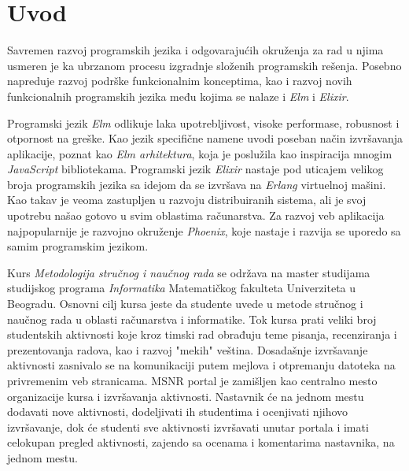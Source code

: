 \documentclass[12pt,oneside]{memoir}
\begin{document}
\frontmatter
\naslovna
\komisija
\apstrakt
\tableofcontents*

\mainmatter

\chapter{Uvod}
Savremen razvoj programskih jezika i odgovarajućih okruženja za rad u njima
usmeren je ka ubrzanom procesu izgradnje složenih programskih rešenja. Posebno
napreduje razvoj podrške funkcionalnim konceptima, kao i razvoj novih funkcionalnih
programskih jezika među kojima se nalaze i \emph{Elm} i \emph{Elixir}. 

Programski jezik \emph{Elm} odlikuje laka upotrebljivost, visoke performase,
robusnost i otpornost na greške. Kao jezik specifične namene uvodi poseban
način izvršavanja aplikacije, poznat kao \emph{Elm arhitektura}, koja je
poslužila kao inspiracija mnogim \emph{JavaScript} bibliotekama.
Programski jezik \emph{Elixir} nastaje pod
uticajem velikog broja programskih jezika sa idejom da se izvršava na \emph{Erlang}
virtuelnoj mašini. Kao takav je veoma zastupljen u razvoju distribuiranih sistema,
ali je svoj upotrebu našao gotovo u svim oblastima računarstva.
Za razvoj veb aplikacija najpopularnije je razvojno okruženje \emph{Phoenix}, koje
nastaje i razvija se uporedo sa samim programskim jezikom.

Kurs \emph{Metodologija stručnog i naučnog rada} se održava na master studijama
studijskog programa \emph{Informatika} Matematičkog fakulteta Univerziteta u Beogradu.
Osnovni cilj kursa jeste da studente uvede u metode stručnog i naučnog rada u oblasti računarstva
i informatike. Tok kursa prati veliki broj studentskih aktivnosti koje kroz timski rad
obrađuju teme pisanja, recenziranja i prezentovanja radova, kao i razvoj "mekih" veština.
Dosadašnje izvršavanje aktivnosti zasnivalo se na komunikaciji putem mejlova i otpremanju datoteka na
privremenim veb stranicama. MSNR portal je zamišljen kao centralno mesto organizacije kursa i izvršavanja
aktivnosti. Nastavnik će na jednom mestu dodavati nove aktivnosti, dodeljivati ih studentima i ocenjivati
njihovo izvršavanje, dok će studenti sve aktivnosti izvršavati unutar portala i imati celokupan
pregled aktivnosti, zajendo sa ocenama i komentarima nastavnika, na jednom mestu.
\end{document}
